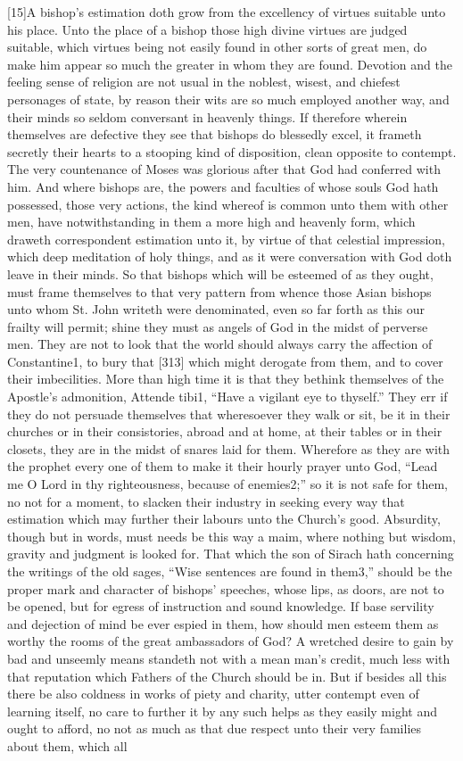 [15]A bishop’s estimation doth grow from the excellency of virtues suitable unto his place. Unto the place of a bishop those high divine virtues are judged suitable, which virtues being not easily found in other sorts of great men, do make him appear so much the greater in whom they are found. Devotion and the feeling sense of religion are not usual in the noblest, wisest, and chiefest personages of state, by reason their wits are so much employed another way, and their minds so seldom conversant in heavenly things. If therefore wherein themselves are defective they see that bishops do blessedly excel, it frameth secretly their hearts to a stooping kind of disposition, clean opposite to contempt. The very countenance of Moses was glorious after that God had conferred with him. And where bishops are, the powers and faculties of whose souls God hath possessed, those very actions, the kind whereof is common unto them with other men, have notwithstanding in them a more high and heavenly form, which draweth correspondent estimation unto it, by virtue of that celestial impression, which deep meditation of holy things, and as it were conversation with God doth leave in their minds. So that bishops which will be esteemed of as they ought, must frame themselves to that very pattern from whence those Asian bishops unto whom St. John writeth were denominated, even so far forth as this our frailty will permit; shine they must as angels of God in the midst of perverse men. They are not to look that the world should always carry the affection of Constantine1, to bury that [313] which might derogate from them, and to cover their imbecilities. More than high time it is that they bethink themselves of the Apostle’s admonition, Attende tibi1, “Have a vigilant eye to thyself.” They err if they do not persuade themselves that wheresoever they walk or sit, be it in their churches or in their consistories, abroad and at home, at their tables or in their closets, they are in the midst of snares laid for them. Wherefore as they are with the prophet every one of them to make it their hourly prayer unto God, “Lead me O Lord in thy righteousness, because of enemies2;” so it is not safe for them, no not for a moment, to slacken their industry in seeking every way that estimation which may further their labours unto the Church’s good. Absurdity, though but in words, must needs be this way a maim, where nothing but wisdom, gravity and judgment is looked for. That which the son of Sirach hath concerning the writings of the old sages, “Wise sentences are found in them3,” should be the proper mark and character of bishops’ speeches, whose lips, as doors, are not to be opened, but for egress of instruction and sound knowledge. If base servility and dejection of mind be ever espied in them, how should men esteem them as worthy the rooms of the great ambassadors of God? A wretched desire to gain by bad and unseemly means standeth not with a mean man’s credit, much less with that reputation which Fathers of the Church should be in. But if besides all this there be also coldness in works of piety and charity, utter contempt even of learning itself, no care to further it by any such helps as they easily might and ought to afford, no not as much as that due respect unto their very families about them, which all 